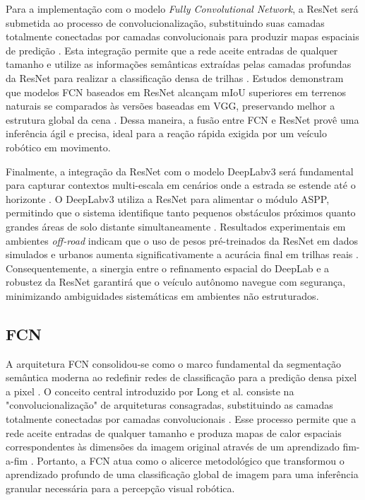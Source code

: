 \documentclass[a4paper,10pt, twocolumn]{article}
\begin{document}
Para a implementação com o modelo \textit{Fully Convolutional Network}, a ResNet será submetida ao processo 
de convolucionalização, substituindo suas camadas totalmente conectadas por camadas convolucionais para produzir mapas 
espaciais de predição \cite{10742323, LATEEF2019321, Maturana2017}. Esta integração permite que a rede aceite 
entradas de qualquer tamanho e utilize as informações semânticas extraídas pelas camadas profundas da 
ResNet para realizar a classificação densa de trilhas \cite{10742323, Sgibnev2020, Maturana2017}. Estudos 
demonstram que modelos FCN baseados em ResNet alcançam mIoU superiores em terrenos naturais se 
comparados às versões baseadas em VGG, preservando melhor a estrutura global da cena \cite{10742323, Sgibnev2020}. 
Dessa maneira, a fusão entre FCN e ResNet provê uma inferência ágil e precisa, ideal para a reação rápida exigida por 
um veículo robótico em movimento.

Finalmente, a integração da ResNet com o modelo DeepLabv3 será fundamental para capturar contextos multi-escala em 
cenários onde a estrada se estende até o horizonte \cite{Sgibnev2020, BEYCIMEN2026113680, LATEEF2019321}. O DeepLabv3 utiliza a 
ResNet para alimentar o módulo ASPP, permitindo que o sistema identifique tanto 
pequenos obstáculos próximos quanto grandes áreas de solo distante simultaneamente \cite{Sgibnev2020, BEYCIMEN2026113680, LATEEF2019321}. 
Resultados experimentais em ambientes \textit{off-road} indicam que o uso de pesos pré-treinados da ResNet em dados simulados e 
urbanos aumenta significativamente a acurácia final em trilhas reais \cite{Sgibnev2020, BEYCIMEN2026113680, LATEEF2019321}. 
Consequentemente, a sinergia entre o refinamento espacial do DeepLab e a robustez da ResNet garantirá que o 
veículo autônomo navegue com segurança, minimizando ambiguidades sistemáticas em ambientes não estruturados.

\subsection{FCN}

A arquitetura FCN consolidou-se como o marco fundamental da segmentação semântica moderna ao redefinir redes de classificação para a 
predição densa pixel a pixel \cite{LATEEF2019321, GARCIAGARCIA201841, Long2015}. O conceito 
central introduzido por Long et al. consiste na "convolucionalização" de arquiteturas consagradas, substituindo as camadas 
totalmente conectadas por camadas convolucionais \cite{Long2015, DBLP:journals/corr/Garcia-GarciaOO17, 10742323}. Esse 
processo permite que a rede aceite entradas de qualquer tamanho e produza mapas de calor espaciais 
correspondentes às dimensões da imagem original através de um aprendizado fim-a-fim 
\cite{Long2015, s19112577, Maturana2017}. Portanto, a FCN atua como o alicerce metodológico que transformou o 
aprendizado profundo de uma classificação global de imagem para uma inferência granular necessária para a percepção visual robótica.
\end{document}
